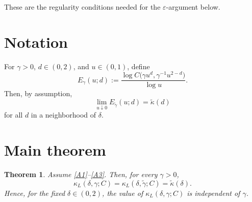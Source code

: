 \documentclass[11pt]{article}
\newtheorem{theorem}{Theorem}
\begin{document}
These are the regularity conditions needed for the \(\varepsilon\)-argument below.

\section*{Notation}

For \(\gamma>0\), \(d\in(0,2)\), and \(u\in(0,1)\), define
\[
E_\gamma(u;d)
:=
\frac{\log C\!\bigl(\gamma u^d,\gamma^{-1}u^{2-d}\bigr)}{\log u}.
\]
Then, by assumption,
\[
\lim_{u\downarrow 0} E_{\tilde\gamma}(u;d)=\tilde{\kappa}(d)
\]
for all \(d\) in a neighborhood of \(\delta\).

\section*{Main theorem}

\begin{theorem}\label{thm:gamma-invariance}
Assume \ref{A1}--\ref{A3}. Then, for every \(\gamma>0\),
\[
\kappa_L(\delta,\gamma;C)=\kappa_L(\delta,\tilde\gamma;C)=\tilde{\kappa}(\delta).
\]
Hence, for the fixed \(\delta\in(0,2)\), the value of \(\kappa_L(\delta,\gamma;C)\) is independent of \(\gamma\).
\end{theorem}
\end{document}
